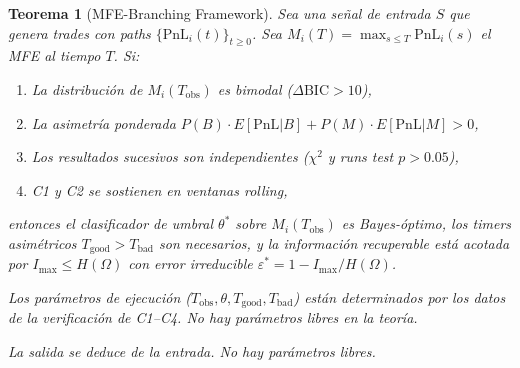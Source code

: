 \documentclass[11pt,a4paper]{article}
\newtheorem{theorem}{Teorema}
\begin{document}
\begin{theorem}[MFE-Branching Framework]
Sea una señal de entrada $S$ que genera trades con paths $\{\text{PnL}_i(t)\}_{t \geq 0}$. Sea $M_i(T) = \max_{s \leq T} \text{PnL}_i(s)$ el MFE al tiempo $T$. Si:
\begin{enumerate}
\item[\textbf{C1}:] La distribución de $M_i(T_{\text{obs}})$ es bimodal ($\Delta\text{BIC} > 10$),
\item[\textbf{C2}:] La asimetría ponderada $P(B)\cdot E[\text{PnL}|B] + P(M)\cdot E[\text{PnL}|M] > 0$,
\item[\textbf{C3}:] Los resultados sucesivos son independientes ($\chi^2$ y runs test $p > 0.05$),
\item[\textbf{C4}:] C1 y C2 se sostienen en ventanas rolling,
\end{enumerate}
entonces el clasificador de umbral $\theta^*$ sobre $M_i(T_{\text{obs}})$ es Bayes-óptimo, los timers asimétricos $T_{\text{good}} > T_{\text{bad}}$ son necesarios, y la información recuperable está acotada por $I_{\max} \leq H(\Omega)$ con error irreducible $\varepsilon^* = 1 - I_{\max}/H(\Omega)$.
 
Los parámetros de ejecución ($T_{\text{obs}}, \theta, T_{\text{good}}, T_{\text{bad}}$) están determinados por los datos de la verificación de C1--C4. No hay parámetros libres en la teoría.
\end{theorem}
 
\vfill
\begin{center}
\small \textit{La salida se deduce de la entrada. No hay parámetros libres.}
\end{center}
 
\end{document}
